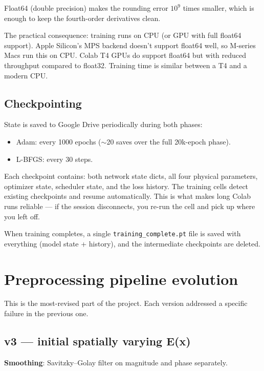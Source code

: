 \documentclass[11pt,a4paper]{article}
\begin{document}
Float64 (double precision) makes the rounding error $10^9$ times smaller, which is enough to keep the fourth-order derivatives clean.

The practical consequence: training runs on CPU (or GPU with full float64 support). Apple Silicon's MPS backend doesn't support float64 well, so M-series Macs run this on CPU. Colab T4 GPUs do support float64 but with reduced throughput compared to float32. Training time is similar between a T4 and a modern CPU.

\subsection{Checkpointing}

State is saved to Google Drive periodically during both phases:
\begin{itemize}[leftmargin=*, itemsep=2pt]
\item Adam: every 1000 epochs ($\sim$20 saves over the full 20k-epoch phase).
\item L-BFGS: every 30 steps.
\end{itemize}
Each checkpoint contains: both network state dicts, all four physical parameters, optimizer state, scheduler state, and the loss history. The training cells detect existing checkpoints and resume automatically. This is what makes long Colab runs reliable --- if the session disconnects, you re-run the cell and pick up where you left off.

When training completes, a single \texttt{training\_complete.pt} file is saved with everything (model state + history), and the intermediate checkpoints are deleted.

\section{Preprocessing pipeline evolution}
\label{sec:preprocessing}

This is the most-revised part of the project. Each version addressed a specific failure in the previous one.

\subsection{v3 --- initial spatially varying E(x)}

\textbf{Smoothing}: Savitzky--Golay filter on magnitude and phase separately.
\end{document}
